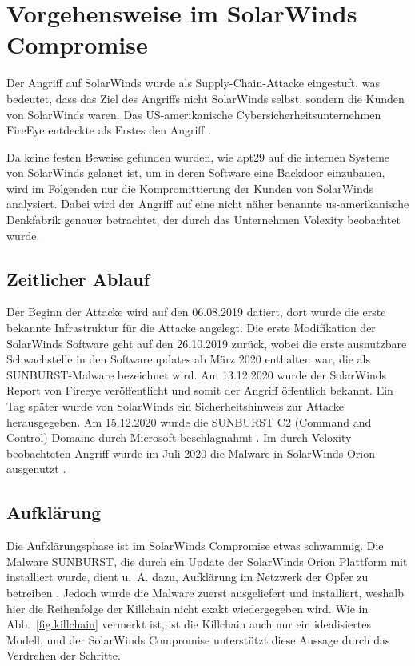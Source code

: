 \documentclass[conference]{IEEEtran}
\begin{document}
\section{Vorgehensweise im SolarWinds Compromise}

Der Angriff auf SolarWinds wurde als Supply-Chain-Attacke eingestuft, was bedeutet, dass das Ziel des Angriffs nicht SolarWinds selbst, sondern die Kunden von SolarWinds waren.
Das US-amerikanische Cybersicherheitsunternehmen FireEye entdeckte als Erstes den Angriff \cite{9579611}.

Da keine festen Beweise gefunden wurden, wie \ac{apt}29 auf die internen Systeme von SolarWinds gelangt ist, um in deren Software eine Backdoor einzubauen, wird im Folgenden nur die Kompromittierung der Kunden von SolarWinds analysiert.
Dabei wird der Angriff auf eine nicht näher benannte us-amerikanische Denkfabrik genauer betrachtet, der durch das Unternehmen Volexity beobachtet wurde.

\subsection{Zeitlicher Ablauf}
Der Beginn der Attacke wird auf den 06.08.2019 datiert, dort wurde die erste bekannte Infrastruktur für die Attacke angelegt.
Die erste Modifikation der SolarWinds Software geht auf den 26.10.2019 zurück, wobei die erste ausnutzbare Schwachstelle in den Softwareupdates ab März 2020 enthalten war, die als SUNBURST-Malware bezeichnet wird.
Am 13.12.2020 wurde der SolarWinds Report von Fireeye veröffentlicht und somit der Angriff öffentlich bekannt.
Ein Tag später wurde von SolarWinds ein Sicherheitshinweis zur Attacke herausgegeben.
Am 15.12.2020 wurde die SUNBURST C2 (Command and Control) Domaine durch Microsoft beschlagnahmt \cite{Unit2020}.
Im durch Veloxity beobachteten Angriff wurde im Juli 2020 die Malware in SolarWinds Orion ausgenutzt \cite{Cash2020}.

\subsection{Aufklärung}
Die Aufklärungsphase ist im SolarWinds Compromise etwas schwammig.
Die Malware SUNBURST, die durch ein Update der SolarWinds Orion Plattform mit installiert wurde, dient u.~A. dazu, Aufklärung im Netzwerk der Opfer zu betreiben \cite{Intelligence2020}.
Jedoch wurde die Malware zuerst ausgeliefert und installiert, weshalb hier die Reihenfolge der Killchain nicht exakt wiedergegeben wird.
Wie in Abb.~\ref{fig.killchain} vermerkt ist, ist die Killchain auch nur ein idealisiertes Modell, und der SolarWinds Compromise unterstützt diese Aussage durch das Verdrehen der Schritte.
\end{document}

